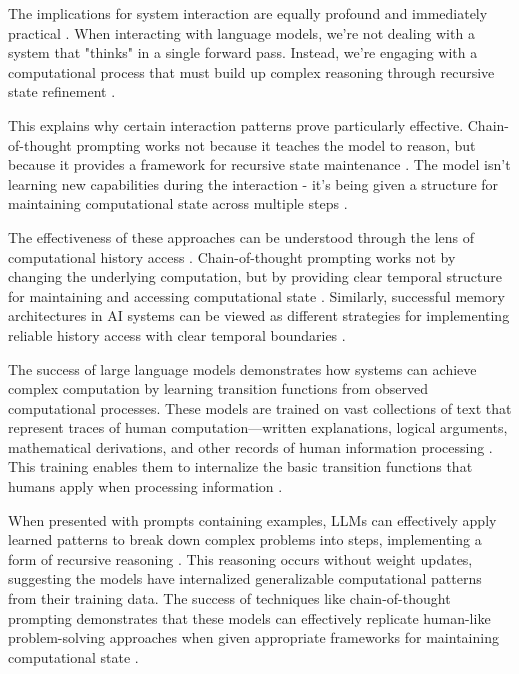 \documentclass[12pt]{article}
\begin{document}
The implications for system interaction are equally profound and immediately practical \cite{wei2022chain}. When interacting with language models, we're not dealing with a system that "thinks" in a single forward pass. Instead, we're engaging with a computational process that must build up complex reasoning through recursive state refinement \cite{dickson2024trust}.

This explains why certain interaction patterns prove particularly effective. Chain-of-thought prompting works not because it teaches the model to reason, but because it provides a framework for recursive state maintenance \cite{wei2022chain}. The model isn't learning new capabilities during the interaction - it's being given a structure for maintaining computational state across multiple steps \cite{ahn2024recursive}.

The effectiveness of these approaches can be understood through the lens of computational history access \cite{fu2024memory}. Chain-of-thought prompting works not by changing the underlying computation, but by providing clear temporal structure for maintaining and accessing computational state \cite{wei2022chain}. Similarly, successful memory architectures in AI systems can be viewed as different strategies for implementing reliable history access with clear temporal boundaries \cite{yang2013survey}.

The success of large language models demonstrates how systems can achieve complex computation by learning transition functions from observed computational processes. These models are trained on vast collections of text that represent traces of human computation---written explanations, logical arguments, mathematical derivations, and other records of human information processing \cite{brown2020language}. This training enables them to internalize the basic transition functions that humans apply when processing information \cite{wei2022chain}.

When presented with prompts containing examples, LLMs can effectively apply learned patterns to break down complex problems into steps, implementing a form of recursive reasoning \cite{wei2022chain}. This reasoning occurs without weight updates, suggesting the models have internalized generalizable computational patterns from their training data. The success of techniques like chain-of-thought prompting demonstrates that these models can effectively replicate human-like problem-solving approaches when given appropriate frameworks for maintaining computational state \cite{wei2022emergent}.
\end{document}
